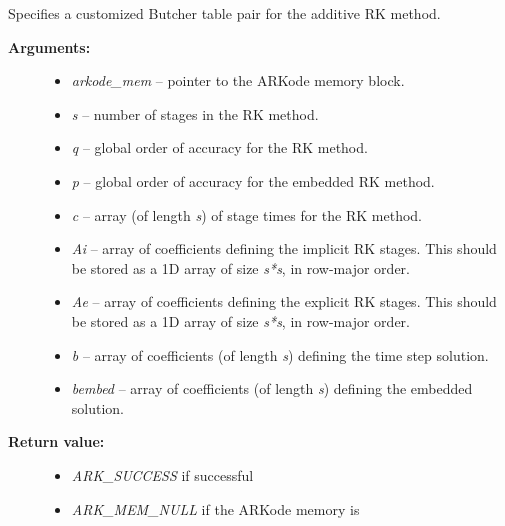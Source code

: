 \documentclass[letterpaper,10pt,english]{sphinxmanual}
\begin{document}
\begin{fulllineitems}
\label{c_interface/User_callable:ARKodeSetARKTables}
Specifies a customized Butcher table pair for the
additive RK method.
\begin{description}
\item[{\textbf{Arguments:}}] \leavevmode\begin{itemize}
\item {} 
\emph{arkode\_mem} -- pointer to the ARKode memory block.

\item {} 
\emph{s} -- number of stages in the RK method.

\item {} 
\emph{q} -- global order of accuracy for the RK method.

\item {} 
\emph{p} -- global order of accuracy for the embedded RK method.

\item {} 
\emph{c} -- array (of length \emph{s}) of stage times for the RK method.

\item {} 
\emph{Ai} -- array of coefficients defining the implicit RK stages.  This should
be stored as a 1D array of size \emph{s*s}, in row-major order.

\item {} 
\emph{Ae} -- array of coefficients defining the explicit RK stages.  This should
be stored as a 1D array of size \emph{s*s}, in row-major order.

\item {} 
\emph{b} -- array of coefficients (of length \emph{s}) defining the time step solution.

\item {} 
\emph{bembed} -- array of coefficients (of length \emph{s}) defining the embedded solution.

\end{itemize}

\item[{\textbf{Return value:}}] \leavevmode\begin{itemize}
\item {} 
\emph{ARK\_SUCCESS} if successful

\item {} 
\emph{ARK\_MEM\_NULL} if the ARKode memory is 


\end{itemize}
\end{description}
\end{fulllineitems}
\end{document}
